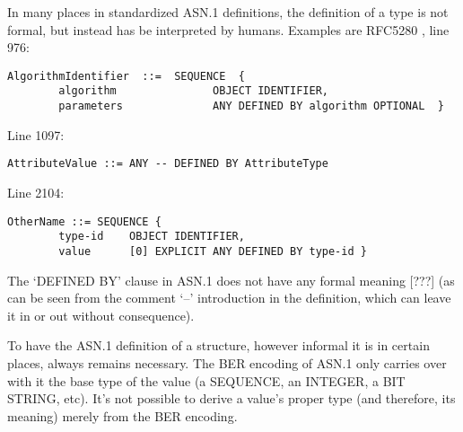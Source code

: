 
In many places in standardized ASN.1 definitions, the definition of a type 
is not formal, but instead has be interpreted by humans. Examples are 
RFC5280 \cite{bib:cert}, line 976:

\begin{changemargin}{-60mm}{0mm}
\begin{myquote}
\begin{verbatim}
AlgorithmIdentifier  ::=  SEQUENCE  {
        algorithm               OBJECT IDENTIFIER,
        parameters              ANY DEFINED BY algorithm OPTIONAL  }
\end{verbatim}
\end{myquote}
\end{changemargin}

Line 1097:

\begin{changemargin}{-60mm}{0mm}
\begin{myquote}
\begin{verbatim}
AttributeValue ::= ANY -- DEFINED BY AttributeType
\end{verbatim}
\end{myquote}
\end{changemargin}

Line 2104:

\begin{changemargin}{-60mm}{0mm}
\begin{myquote}
\begin{verbatim}
OtherName ::= SEQUENCE {
        type-id    OBJECT IDENTIFIER,
        value      [0] EXPLICIT ANY DEFINED BY type-id }
\end{verbatim}
\end{myquote}
\end{changemargin}

The ‘DEFINED BY’ clause in ASN.1 does not have any formal meaning 
[???] (as can be seen from the comment ‘--’ introduction in the 
definition, which can leave it in or out without consequence).


To have the ASN.1 definition of a structure, however informal it is in 
certain places, always remains necessary. The BER encoding of ASN.1 only 
carries over with it the base type of the value (a SEQUENCE, an INTEGER, a 
BIT STRING, etc). It’s not possible to derive a value’s proper type 
(and therefore, its meaning) merely from the BER encoding.

